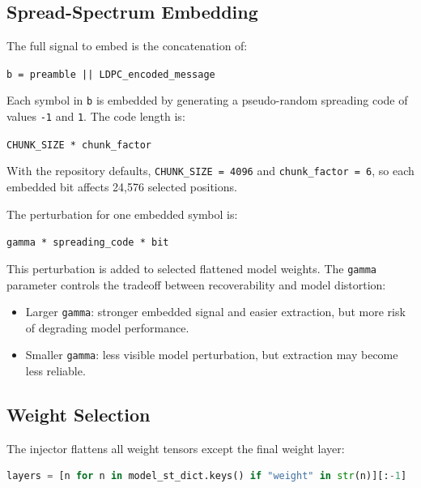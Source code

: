 \documentclass[11pt,a4paper]{article}
\newcommand{\code}[1]{\texttt{#1}}
\begin{document}
\subsection{Spread-Spectrum Embedding}

The full signal to embed is the concatenation of:

\begin{center}
\code{b = preamble || LDPC\_encoded\_message}
\end{center}

Each symbol in \code{b} is embedded by generating a pseudo-random spreading code of values \code{-1} and \code{1}. The code length is:

\begin{center}
\code{CHUNK\_SIZE * chunk\_factor}
\end{center}

With the repository defaults, \code{CHUNK\_SIZE = 4096} and \code{chunk\_factor = 6}, so each embedded bit affects 24,576 selected positions.

The perturbation for one embedded symbol is:

\begin{center}
\code{gamma * spreading\_code * bit}
\end{center}

This perturbation is added to selected flattened model weights. The \code{gamma} parameter controls the tradeoff between recoverability and model distortion:

\begin{itemize}[leftmargin=1.4em]
  \item Larger \code{gamma}: stronger embedded signal and easier extraction, but more risk of degrading model performance.
  \item Smaller \code{gamma}: less visible model perturbation, but extraction may become less reliable.
\end{itemize}

\subsection{Weight Selection}

The injector flattens all weight tensors except the final weight layer:

\begin{lstlisting}[language=Python]
layers = [n for n in model_st_dict.keys() if "weight" in str(n)][:-1]
\end{lstlisting}
\end{document}
